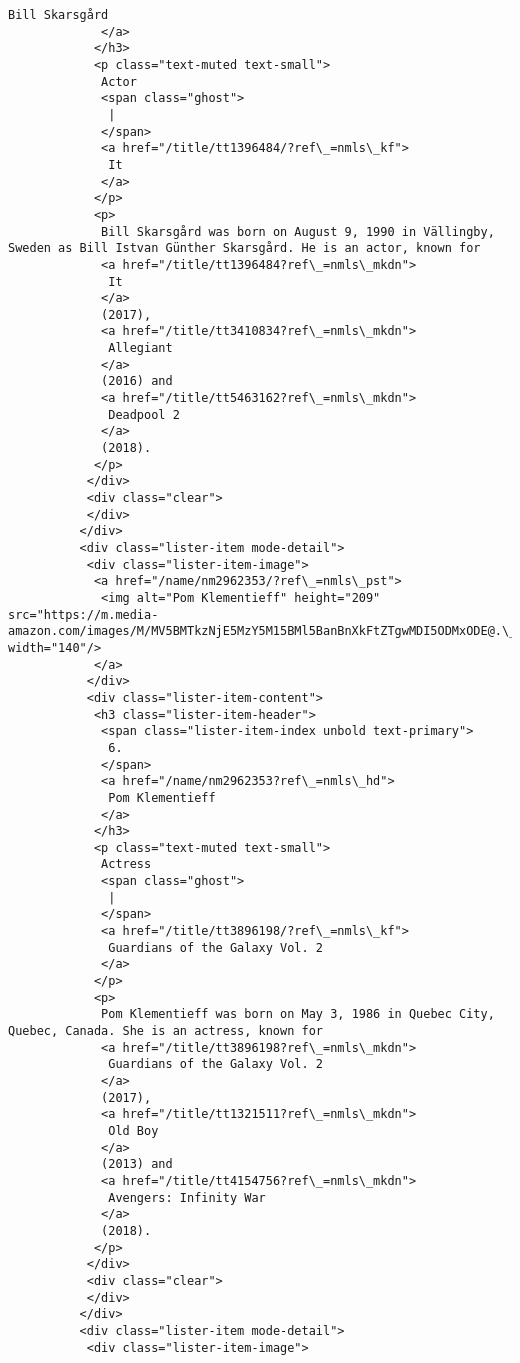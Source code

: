 \documentclass[11pt]{article}
\begin{document}
\begin{Verbatim}[commandchars=\\\{\}]
              Bill Skarsgård
             </a>
            </h3>
            <p class="text-muted text-small">
             Actor
             <span class="ghost">
              |
             </span>
             <a href="/title/tt1396484/?ref\_=nmls\_kf">
              It
             </a>
            </p>
            <p>
             Bill Skarsgård was born on August 9, 1990 in Vällingby, Sweden as Bill Istvan Günther Skarsgård. He is an actor, known for
             <a href="/title/tt1396484?ref\_=nmls\_mkdn">
              It
             </a>
             (2017),
             <a href="/title/tt3410834?ref\_=nmls\_mkdn">
              Allegiant
             </a>
             (2016) and
             <a href="/title/tt5463162?ref\_=nmls\_mkdn">
              Deadpool 2
             </a>
             (2018).
            </p>
           </div>
           <div class="clear">
           </div>
          </div>
          <div class="lister-item mode-detail">
           <div class="lister-item-image">
            <a href="/name/nm2962353/?ref\_=nmls\_pst">
             <img alt="Pom Klementieff" height="209" src="https://m.media-amazon.com/images/M/MV5BMTkzNjE5MzY5M15BMl5BanBnXkFtZTgwMDI5ODMxODE@.\_V1\_UY209\_CR80,0,140,209\_AL\_.jpg" width="140"/>
            </a>
           </div>
           <div class="lister-item-content">
            <h3 class="lister-item-header">
             <span class="lister-item-index unbold text-primary">
              6.
             </span>
             <a href="/name/nm2962353?ref\_=nmls\_hd">
              Pom Klementieff
             </a>
            </h3>
            <p class="text-muted text-small">
             Actress
             <span class="ghost">
              |
             </span>
             <a href="/title/tt3896198/?ref\_=nmls\_kf">
              Guardians of the Galaxy Vol. 2
             </a>
            </p>
            <p>
             Pom Klementieff was born on May 3, 1986 in Quebec City, Quebec, Canada. She is an actress, known for
             <a href="/title/tt3896198?ref\_=nmls\_mkdn">
              Guardians of the Galaxy Vol. 2
             </a>
             (2017),
             <a href="/title/tt1321511?ref\_=nmls\_mkdn">
              Old Boy
             </a>
             (2013) and
             <a href="/title/tt4154756?ref\_=nmls\_mkdn">
              Avengers: Infinity War
             </a>
             (2018).
            </p>
           </div>
           <div class="clear">
           </div>
          </div>
          <div class="lister-item mode-detail">
           <div class="lister-item-image">

\end{Verbatim}
\end{document}
